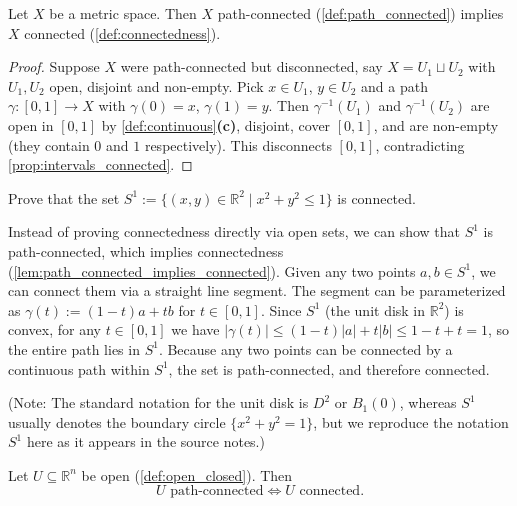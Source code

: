 \begin{lemma}
\label{lem:path_connected_implies_connected}
Let $X$ be a metric space. Then $X$ path-connected (\cref{def:path_connected}) implies $X$
connected (\cref{def:connectedness}).
\end{lemma}

\begin{proof}
Suppose $X$ were path-connected but disconnected, say $X = U_1 \sqcup U_2$ with $U_1,U_2$ open,
disjoint and non-empty. Pick $x \in U_1$, $y \in U_2$ and a path $\gamma : [0,1] \to X$ with
$\gamma(0)=x$, $\gamma(1)=y$. Then $\gamma^{-1}(U_1)$ and $\gamma^{-1}(U_2)$ are open in $[0,1]$
by \cref{def:continuous}\textbf{(c)}, disjoint, cover $[0,1]$, and are non-empty (they contain
$0$ and $1$ respectively). This disconnects $[0,1]$, contradicting
\cref{prop:intervals_connected}.
\end{proof}

\begin{exercise}
\label{ex:disk_connected}
Prove that the set $S^1 := \{ (x,y) \in \mathbb{R}^2 \mid x^2 + y^2 \leq 1 \}$ is connected.
\end{exercise}

\begin{exercisesolution}
Instead of proving connectedness directly via open sets, we can show that $S^1$ is path-connected, which implies connectedness (\cref{lem:path_connected_implies_connected}). Given any two points $a, b \in S^1$, we can connect them via a straight line segment. The segment can be parameterized as $\gamma(t) := (1-t)a + tb$ for $t \in [0,1]$. Since $S^1$ (the unit disk in $\mathbb{R}^2$) is convex, for any $t \in [0,1]$ we have $|\gamma(t)| \leq (1-t)|a| + t|b| \leq 1-t + t = 1$, so the entire path lies in $S^1$. Because any two points can be connected by a continuous path within $S^1$, the set is path-connected, and therefore connected.

(Note: The standard notation for the unit disk is $D^2$ or $B_1(0)$, whereas $S^1$ usually denotes the boundary circle $\{x^2+y^2=1\}$, but we reproduce the notation $S^1$ here as it appears in the source notes.)
\end{exercisesolution}

\begin{proposition}
\label{prop:open_euclidean_connected_path_connected}
Let $U \subseteq \mathbb{R}^n$ be open (\cref{def:open_closed}). Then
\[
U \text{ path-connected} \iff U \text{ connected}.
\]
\end{proposition}

